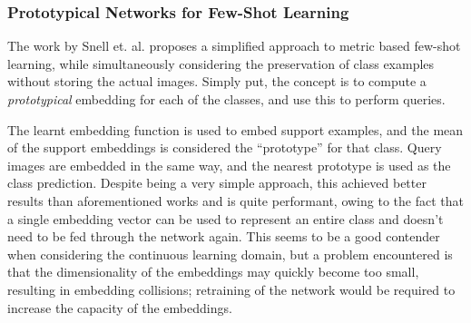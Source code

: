 \documentclass{report}
\begin{document}
	\subsubsection{Prototypical Networks for Few-Shot Learning}
	The work by Snell et. al. \parencite{prototypical} proposes a simplified approach to metric based few-shot learning, while simultaneously considering the preservation of class examples without storing the actual images. Simply put, the concept is to compute a \emph{prototypical} embedding for each of the classes, and use this to perform queries. \par
	The learnt embedding function is used to embed support examples, and the mean of the support embeddings is considered the ``prototype'' for that class. Query images are embedded in the same way, and the nearest prototype is used as the class prediction. Despite being a very simple approach, this achieved better results than aforementioned works and is quite performant, owing to the fact that a single embedding vector can be used to represent an entire class and doesn't need to be fed through the network again. This seems to be a good contender when considering the continuous learning domain, but a problem encountered is that the dimensionality of the embeddings may quickly become too small, resulting in embedding collisions; retraining of the network would be required to increase the capacity of the embeddings. \par
\end{document}
